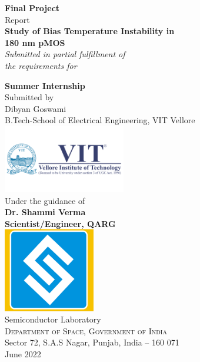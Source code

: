 \begin{titlepage}

\begin{center}

\textup{\small {\bf Final Project} \\ Report}\\[0.2in]

\Large \textbf {Study of Bias Temperature Instability in \\180 nm pMOS}\\[0.5in]

       \small \emph{Submitted in partial fulfillment of\\
        the requirements for }
        \vspace{.2in}

       \normalsize {\bf Summer Internship }\\[0.2in]

\small Submitted by \\

Dibyan Goswami \\B.Tech-School of Electrical Engineering, VIT Vellore \\
\includegraphics[width=0.4\textwidth]{./vit-logo}\\[0.1in]

Under the guidance of\\
{\textbf{Dr. Shammi Verma\\Scientist/Engineer, QARG}}\\[0.2in]



\includegraphics[width=0.3\textwidth]{./scl-logo}\\[0.2in]
\Large{Semiconductor Laboratory}\\
\Large
\textsc{Department of Space, Government of India}\\
\normalsize{Sector 72, S.A.S Nagar, Punjab, India -- 160 071} \\
\vspace{0.2cm}
June 2022

\end{center}

\end{titlepage}
